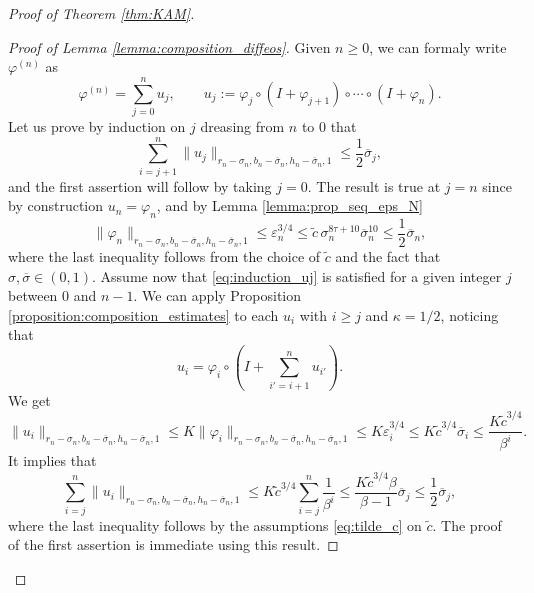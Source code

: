 \documentclass[10pt]{article}
\begin{document}
\begin{proof}[Proof of Theorem \ref{thm:KAM}]
\begin{proof}[Proof of Lemma \ref{lemma:composition_diffeos}]
    Given $n\geq 0$, we can formaly write $\varphi^{(n)}$ as
    \[
    \varphi^{(n)} = \sum_{j=0}^n u_j,
    \qquad
    u_j := \varphi_j\circ(I+\varphi_{j+1})\circ\cdots\circ (I+\varphi_n).
    \]
    Let us prove by induction on $j$ dreasing from $n$ to $0$ that
    \begin{equation}
    \label{eq:induction_uj}
    \sum_{i=j+1}^n \|u_j\|_{r_n-\sigma_n, b_n-\overline\sigma_n, h_n-\overline\sigma_n,1}\leq \frac{1}{2}\overline\sigma_j,
    \end{equation}
    and the first assertion will follow by taking $j=0$. The result is true at $j=n$ since by construction $u_n=\varphi_n$, and by Lemma \ref{lemma:prop_seq_eps_N}
    \[
    \|\varphi_n\|_{r_n-\sigma_n, b_n-\overline\sigma_n, h_n-\overline\sigma_n,1}
    \leq \varepsilon_n^{3/4} 
    \leq \tilde c
    \,\sigma_n^{8\tau+10}\overline\sigma_n^{10}
    \leq \frac{1}{2}\overline\sigma_n,
    \]
    where the last inequality follows from the choice of $\tilde c$ and the fact that $\sigma,\overline\sigma\in(0,1)$.
    Assume now that \eqref{eq:induction_uj} is satisfied for a given integer $j$ between $0$ and $n-1$. 
    We can apply Proposition \ref{proposition:composition_estimates} to each $u_i$ with $i\geq j$ and $\kappa=1/2$, noticing that
    \[
    u_i = \varphi_i\circ\left(I+\sum_{i'=i+1}^nu_{i'}\right).
    \]
    We get
    \[
    \|u_i\|_{r_n-\sigma_n, b_n-\overline\sigma_n, h_n-\overline\sigma_n,1}
    \leq K\|\varphi_i\|_{r_n-\sigma_n, b_n-\overline\sigma_n, h_n-\overline\sigma_n,1}
    \leq 
    K\varepsilon_i^{3/4}
    \leq K\tilde c^{3/4}\overline\sigma_i \leq \frac{K\tilde c^{3/4}}{\beta^i}.
    \]
    It implies that
    \[
    \sum_{i=j}^n \|u_i\|_{r_n-\sigma_n, b_n-\overline\sigma_n, h_n-\overline\sigma_n,1}
    \leq 
    K\tilde c^{3/4}\sum_{i=j}^n\frac{1}{\beta^i}
    \leq 
    \frac{K\tilde c^{3/4}\beta}{\beta-1}\overline\sigma_j\leq \frac{1}{2} \overline\sigma_j,
    \]
    where the last inequality follows by the assumptions \eqref{eq:tilde_c} on $\tilde c$. The proof of the first assertion is immediate using this result.


\end{proof}
\end{proof}
\end{document}

